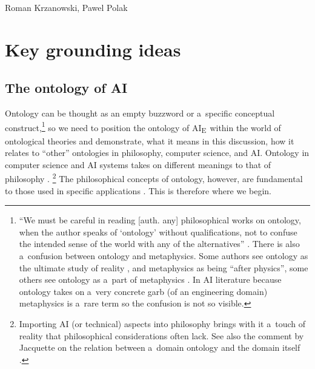 \begin{artengenv2auth}{Roman Krzanowski, Pawel Polak}
\section{Key grounding ideas}
\subsection{The ontology of AI}

Ontology can be thought as an empty buzzword or a~specific conceptual construct,\footnote{``We must be careful in reading [auth. any] philosophical works on ontology, when the author speaks of ‘ontology' without qualifications, not to confuse the intended sense of the world with any of the alternatives''
\parencite[][p.3]{jacquette_ontology_2002}. %
 There is also a~confusion between ontology and metaphysics. Some authors see ontology as the ultimate study of reality 
\parencites[e.g.,][]{jacquette_ontology_2002}[][]{strozewski_ontologia_2004}[or][]{perzanowski_rozprawa_2015}, %
 and metaphysics as being ``after physics'', some others see ontology as a~part of metaphysics 
\parencite[see e.g.][]{van_inwagen_metaphysics_2009}. %
 In AI literature because ontology takes on a~very concrete garb (of an engineering domain) metaphysics is a~rare term so the confusion is not so visible.} so we need to position the ontology of AI\textsubscript{E~}within the world of ontological theories and demonstrate, what it means in this discussion, how it relates to ``other'' ontologies in philosophy, computer science, and AI. Ontology in computer science and AI systems 
\parencites[e.g.,][]{sharman_road_2007}[as well][]{guarino_ontologies_1995}[][]{guarino_what_2009}[][]{swar_unified_2022} %
 takes on different meanings to that of philosophy 
\parencites[e.g.,][]{jacquette_ontology_2002}[][]{strozewski_ontologia_2004}[][]{baker_metaphysics_2007}[][]{chalmers_metametaphysics_2009}[][]{effingham_introduction_2013}[][]{berto_ontology_2015}[][]{perzanowski_rozprawa_2015}[][]{thomasson_ontology_2015}[][]{hofweber_logic_2021}.%
\footnote{Importing AI (or technical) aspects into philosophy brings with it a~touch of reality that philosophical considerations often lack. See also the comment by Jacquette on the relation between a~domain ontology and the domain itself 
\parencite[][p.5]{jacquette_ontology_2002}.%
} The philosophical concepts of ontology, however, are fundamental to those used in specific applications 
\parencite[see the comments of][p.XII]{jacquette_ontology_2002}. %
 This is therefore where we begin.


\end{artengenv2auth}
